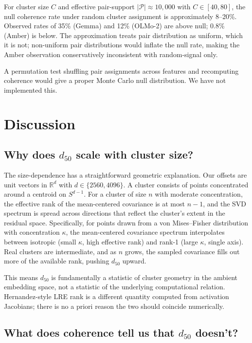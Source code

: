 \documentclass[11pt,letterpaper]{article}
\begin{document}
For cluster size $C$ and effective pair-support $|\mathcal{P}| \approx 10{,}000$ with $C \in [40, 80]$, the null coherence rate under random cluster assignment is approximately 8--20\%. Observed rates of 35\% (Gemma) and 12\% (OLMo-2) are above null; 0.8\% (Amber) is below. The approximation treats pair distribution as uniform, which it is not; non-uniform pair distributions would inflate the null rate, making the Amber observation conservatively inconsistent with random-signal only.

A permutation test shuffling pair assignments across features and recomputing coherence would give a proper Monte Carlo null distribution. We have not implemented this.

\section{Discussion}
\label{sec:discussion}

\subsection{Why does $d_{50}$ scale with cluster size?}

The size-dependence has a straightforward geometric explanation. Our offsets are unit vectors in $\mathbb{R}^d$ with $d \in \{2560, 4096\}$. A cluster consists of points concentrated around a centroid on $S^{d-1}$. For a cluster of size $n$ with moderate concentration, the effective rank of the mean-centered covariance is at most $n - 1$, and the SVD spectrum is spread across directions that reflect the cluster's extent in the residual space. Specifically, for points drawn from a von Mises--Fisher distribution with concentration $\kappa$, the mean-centered covariance spectrum interpolates between isotropic (small $\kappa$, high effective rank) and rank-1 (large $\kappa$, single axis). Real clusters are intermediate, and as $n$ grows, the sampled covariance fills out more of the available rank, pushing $d_{50}$ upward.

This means $d_{50}$ is fundamentally a statistic of cluster geometry in the ambient embedding space, not a statistic of the underlying computational relation. Hernandez-style LRE rank is a different quantity computed from activation Jacobians; there is no a priori reason the two should coincide numerically.

\subsection{What does coherence tell us that $d_{50}$ doesn't?}
\end{document}
